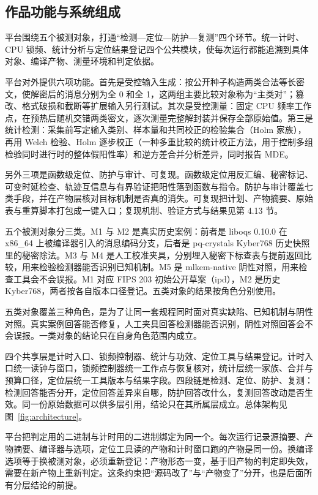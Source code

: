 \subsection{作品功能与系统组成}

平台围绕五个被测对象，打通“检测—定位—防护—复测”四个环节。统一计时、CPU 锁频、统计分析与定位结果登记四个公共模块，使每次运行都能追溯到具体对象、编译产物、测量环境和判定依据。

平台对外提供六项功能。首先是受控输入生成：按公开种子构造两类合法等长密文，使解密后的消息分别为全 0 和全 1，这两组主要比较对象称为“主类对”；篡改、格式破损和截断等扩展输入另行测试。其次是受控测量：固定 CPU 频率工作点，在预热后随机交错两类密文，逐次测量完整解封装并保存全部原始值。第三是统计检测：采集前写定输入类别、样本量和共同校正的检验集合（Holm 家族），再用 Welch 检验、Holm 逐步校正（一种多重比较的统计校正方法，用于控制多组检验同时进行时的整体假阳性率）和逆方差合并分析差异，同时报告 MDE。

另外三项是函数级定位、防护与审计、可复现。函数级定位用反汇编、秘密标记、可变时延检查、轨迹互信息与有界验证把阳性落到函数与指令。防护与审计覆盖七类手段，并在产物层核对目标机制是否真的消失。可复现把计划、产物摘要、原始表与重算脚本打包成一键入口；复现机制、验证方式与结果见第 4.13 节。

五个被测对象分三类。M1 与 M2 是真实历史案例：前者是 liboqs 0.10.0 在 x86\_64 上被编译器引入的消息编码分支，后者是 pq-crystals Kyber768 历史快照里的秘密除法。M3 与 M4 是人工校准夹具，分别埋入秘密下标查表与提前返回比较，用来检验检测器能否识别已知机制。M5 是 mlkem-native 阴性对照，用来检查工具会不会误报。M1 对应 FIPS 203 初始公开草案（ipd），M2 是历史 Kyber768，两者按各自版本口径登记。五类对象的结果按角色分别使用。

五类对象覆盖三种角色，是为了让同一套规程同时面对真实缺陷、已知机制与阴性对照。真实案例回答能否修复，人工夹具回答检测器能否识别，阴性对照回答会不会误报。一类对象的结论只在自身角色范围内成立。

四个共享层是计时入口、锁频控制器、统计与功效、定位工具与结果登记。计时入口统一读钟与窗口，锁频控制器统一工作点与恢复核对，统计层统一家族、合并与预算口径，定位层统一工具版本与结果字段。四段链是检测、定位、防护、复测：检测回答能否分开，定位回答差异来自哪，防护回答改什么，复测回答改动是否生效。同一份原始数据可以供多层引用，结论只在其所属层成立。总体架构见图~\ref{fig:architecture}。

平台把判定用的二进制与计时用的二进制绑定为同一个。每次运行记录源摘要、产物摘要、编译器与选项，定位工具读的产物和计时窗口跑的产物是同一份。换编译选项等于换被测对象，必须重新登记：产物形态一变，基于旧产物的判定即失效，需要在新产物上重新判定。这条约束把“源码改了”与“产物变了”分开，也是后面所有分层结论的前提。

